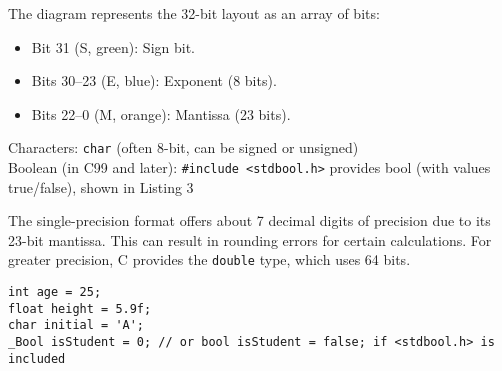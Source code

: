 \documentclass[a4paper,12pt]{article}
\begin{document}
\begin{center}
\end{center}

The diagram represents the 32-bit layout as an array of bits:
\begin{itemize}
    \item Bit 31 (S, green): Sign bit.
    \item Bits 30--23 (E, blue): Exponent (8 bits).
    \item Bits 22--0 (M, orange): Mantissa (23 bits).
\end{itemize}

Characters: \verb|char| (often 8-bit, can be signed or unsigned)\\
Boolean (in C99 and later): \verb|#include <stdbool.h>| provides bool (with values true/false), shown in Listing 3

The single-precision format offers about 7 decimal digits of precision due to its 23-bit mantissa. This can result in rounding errors for certain calculations. For greater precision, C provides the \texttt{double} type, which uses 64 bits.

\begin{lstlisting}[caption=Numerical data types]
int age = 25;
float height = 5.9f;
char initial = 'A';
_Bool isStudent = 0; // or bool isStudent = false; if <stdbool.h> is included\end{lstlisting}
\end{document}

